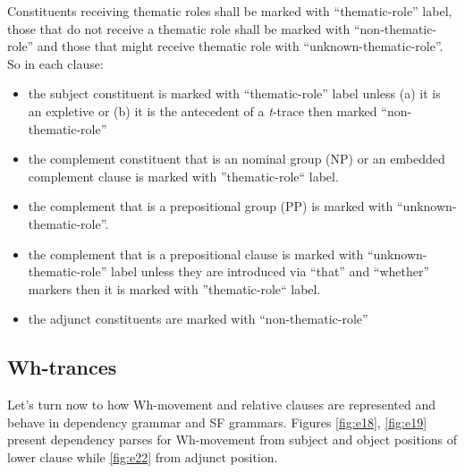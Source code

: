\begin{generalization}\label{gen:thematic-marking}
	Constituents receiving thematic roles shall be marked with ``thematic-role'' label, those that do not receive a thematic role shall be marked with ``non-thematic-role'' and those that might receive thematic role with ``unknown-thematic-role''. So in each clause:
	\begin{itemize}
		\item the subject constituent is marked with ``thematic-role'' label unless (a) it is an expletive or (b) it is the antecedent of a \textit{t}-trace then marked ``non-thematic-role''
		\item the complement constituent that is an nominal group (NP) or an embedded complement clause is marked with ''thematic-role`` label.
		\item the  complement that is a prepositional group (PP) is marked with ``unknown-thematic-role''.
		\item the complement that is a prepositional clause is marked with ``unknown-thematic-role'' label unless they are introduced via ``that'' and ``whether'' markers then it is marked with ''thematic-role`` label.
		\item the adjunct constituents are marked with ``non-thematic-role''
	\end{itemize}
\end{generalization}

\subsection{Wh-trances}
\label{sec:detecting-wh-traces}
Let's turn now to how Wh-movement and relative clauses are represented and behave in dependency grammar and SF grammars. Figures \ref{fig:e18}, \ref{fig:e19} present dependency parses for  Wh-movement from subject and object positions of lower clause while \ref{fig:e22} from adjunct position.

